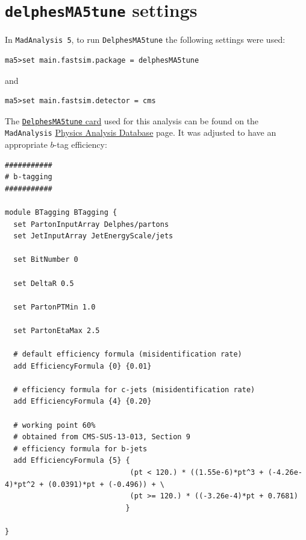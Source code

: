 \documentclass[12pt,A4paper]{article}
\begin{document}
\section{\texttt{delphesMA5tune} settings}
\label{appendix:delphesma5}
In \texttt{MadAnalysis 5}, to run \texttt{DelphesMA5tune} the following settings were used:
\lstset{language=sh}
\begin{lstlisting}
ma5>set main.fastsim.package = delphesMA5tune
\end{lstlisting}
and
\begin{lstlisting}
ma5>set main.fastsim.detector = cms
\end{lstlisting}
The \href{http://madanalysis.irmp.ucl.ac.be/attachment/wiki/PhysicsAnalysisDatabase/delphesMA5tune_card_CMS_SUSY.tcl}{\texttt{DelphesMA5tune} card} used for this analysis can be found on the \texttt{MadAnalysis} \href{http://madanalysis.irmp.ucl.ac.be/attachment/wiki/PhysicsAnalysisDatabase/}{Physics Analysis Database} page.
It was adjusted to have an appropriate $b$-tag efficiency:
\lstset{language=sh}
\begin{lstlisting}
###########
# b-tagging
###########

module BTagging BTagging {
  set PartonInputArray Delphes/partons
  set JetInputArray JetEnergyScale/jets

  set BitNumber 0

  set DeltaR 0.5

  set PartonPTMin 1.0

  set PartonEtaMax 2.5

  # default efficiency formula (misidentification rate)
  add EfficiencyFormula {0} {0.01}

  # efficiency formula for c-jets (misidentification rate)
  add EfficiencyFormula {4} {0.20}

  # working point 60%
  # obtained from CMS-SUS-13-013, Section 9
  # efficiency formula for b-jets
  add EfficiencyFormula {5} {
                             (pt < 120.) * ((1.55e-6)*pt^3 + (-4.26e-4)*pt^2 + (0.0391)*pt + (-0.496)) + \
                             (pt >= 120.) * ((-3.26e-4)*pt + 0.7681)
                            }

}
\end{lstlisting}
\end{document}
